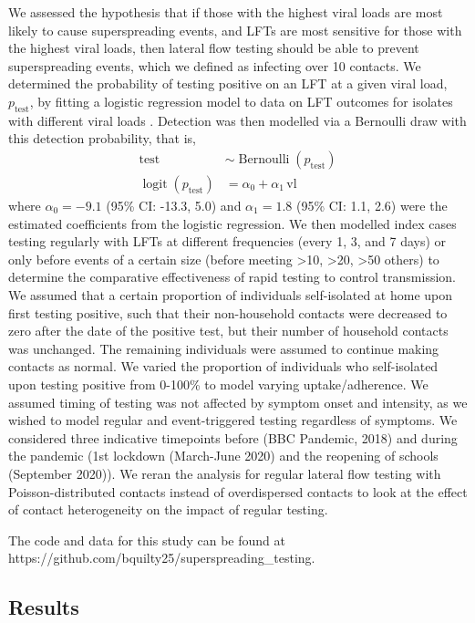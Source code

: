 \documentclass[
  10pt,
  letterpaper,
]{article}
\begin{document}
We assessed the hypothesis that if those with the highest viral loads
are most likely to cause superspreading events, and LFTs are most
sensitive for those with the highest viral loads, then lateral flow
testing should be able to prevent superspreading events, which we
defined as infecting over 10 contacts. We determined the probability of
testing positive on an LFT at a given viral load, \(p_{\mathrm{test}}\),
by fitting a logistic regression model to data on LFT outcomes for
isolates with different viral loads \citep{pickering2021}. Detection was
then modelled via a Bernoulli draw with this detection probability, that
is, \[
\begin{aligned}
\mathrm{test} &\sim \operatorname{Bernoulli}(p_{\mathrm{test}}) \\
\operatorname{logit}(p_{\mathrm{test}}) &= \alpha_0 + \alpha_1\,\mathrm{vl}
\end{aligned}
\] where \(\alpha_0 = -9.1\) (95\% CI: -13.3, 5.0) and
\(\alpha_1 = 1.8\) (95\% CI: 1.1, 2.6) were the estimated coefficients
from the logistic regression. We then modelled index cases testing
regularly with LFTs at different frequencies (every 1, 3, and 7 days) or
only before events of a certain size (before meeting \textgreater10,
\textgreater20, \textgreater50 others) to determine the comparative
effectiveness of rapid testing to control transmission. We assumed that
a certain proportion of individuals self-isolated at home upon first
testing positive, such that their non-household contacts were decreased
to zero after the date of the positive test, but their number of
household contacts was unchanged. The remaining individuals were assumed
to continue making contacts as normal. We varied the proportion of
individuals who self-isolated upon testing positive from 0-100\% to
model varying uptake/adherence. We assumed timing of testing was not
affected by symptom onset and intensity, as we wished to model regular
and event-triggered testing regardless of symptoms. We considered three
indicative timepoints before (BBC Pandemic, 2018) and during the
pandemic (1st lockdown (March-June 2020) and the reopening of schools
(September 2020)). We reran the analysis for regular lateral flow
testing with Poisson-distributed contacts instead of overdispersed
contacts to look at the effect of contact heterogeneity on the impact of
regular testing.

The code and data for this study can be found at
https://github.com/bquilty25/superspreading\_testing.

\subsection{Results}\label{results}
\end{document}
